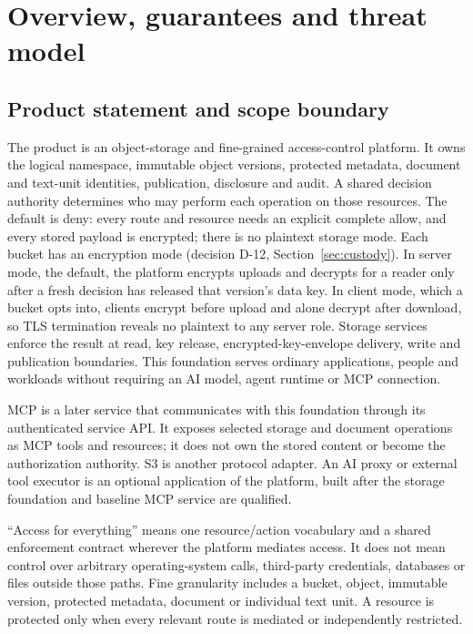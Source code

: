 \section{Overview, guarantees and threat model}\label{sec:overview}
\subsection{Product statement and scope boundary}
The product is an object-storage and fine-grained access-control platform. It owns the logical namespace, immutable object versions, protected metadata, document and text-unit identities, publication, disclosure and audit. A shared decision authority determines who may perform each operation on those resources. The default is deny: every route and resource needs an explicit complete allow, and every stored payload is encrypted; there is no plaintext storage mode. Each bucket has an encryption mode (decision D-12, Section~\ref{sec:custody}). In server mode, the default, the platform encrypts uploads and decrypts for a reader only after a fresh decision has released that version's data key. In client mode, which a bucket opts into, clients encrypt before upload and alone decrypt after download, so TLS termination reveals no plaintext to any server role. Storage services enforce the result at read, key release, encrypted-key-envelope delivery, write and publication boundaries. This foundation serves ordinary applications, people and workloads without requiring an AI model, agent runtime or MCP connection.

MCP is a later service that communicates with this foundation through its authenticated service API. It exposes selected storage and document operations as MCP tools and resources; it does not own the stored content or become the authorization authority. S3 is another protocol adapter. An AI proxy or external tool executor is an optional application of the platform, built after the storage foundation and baseline MCP service are qualified.

``Access for everything'' means one resource/action vocabulary and a shared enforcement contract wherever the platform mediates access. It does not mean control over arbitrary operating-system calls, third-party credentials, databases or files outside those paths. Fine granularity includes a bucket, object, immutable version, protected metadata, document or individual text unit. A resource is protected only when every relevant route is mediated or independently restricted.

